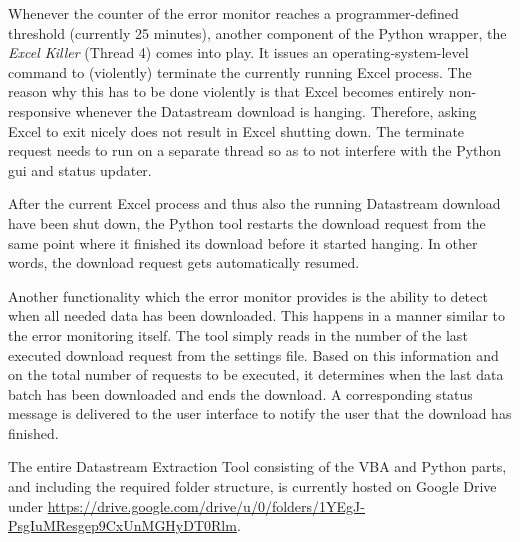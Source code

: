 Whenever the counter of the error monitor reaches a programmer-defined threshold (currently 25 minutes), another component of the Python wrapper, the \textit{Excel Killer} (Thread 4) comes into play. It issues an operating-system-level command to (violently) terminate the currently running Excel process. The reason why this has to be done violently is that Excel becomes entirely non-responsive whenever the Datastream download is hanging. Therefore, asking Excel to exit nicely does not result in Excel shutting down. The terminate request needs to run on a separate thread so as to not interfere with the Python gui and status updater. 

After the current Excel process and thus also the running Datastream download have been shut down, the Python tool restarts the download request from the same point where it finished its download before it started hanging. In other words, the download request gets automatically resumed. 

Another functionality which the error monitor provides is the ability to detect when all needed data has been downloaded. This happens in a manner similar to the error monitoring itself. The tool simply reads in the number of the last executed download request from the settings file. Based on this information and on the total number of requests to be executed, it determines when the last data batch has been downloaded and ends the download. A corresponding status message is delivered to the user interface to notify the user that the download has finished. 

The entire Datastream Extraction Tool consisting of the VBA and Python parts, and including the required folder structure, is currently hosted on Google Drive under \url{https://drive.google.com/drive/u/0/folders/1YEgJ-PsgIuMResgep9CxUnMGHyDT0Rlm}.  
